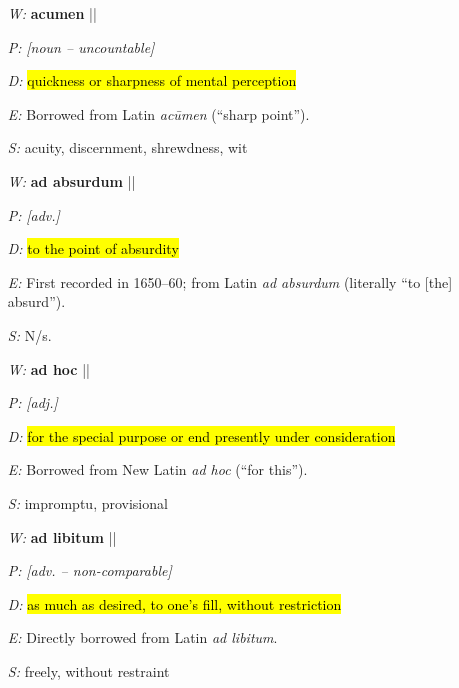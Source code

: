 \documentclass[11pt, table, dvipsnames, svgnames, x11names, xcdraw, titlepage]{article}
\begin{document}
\null

\begin{itemize}[itemsep=0pt, topsep=0pt]
\item[\textit{W:}] \textbf{acumen} \quad || \quad {}
\item[\textit{P:}] \textit{[noun – uncountable]}
\item[\textit{D:}] \hl{quickness or sharpness of mental perception}
\item[\textit{E:}] Borrowed from Latin \textit{ac\={u}men} (``sharp point'').
\item[\textit{S:}] acuity, discernment, shrewdness, wit
\end{itemize}

\null

\begin{itemize}[itemsep=0pt, topsep=0pt]
\item[\textit{W:}] \textbf{ad absurdum} \quad || \quad {}
\item[\textit{P:}] \textit{[adv.]}
\item[\textit{D:}] \hl{to the point of absurdity}
\item[\textit{E:}] First recorded in 1650–60; from Latin \textit{ad absurdum} (literally ``to [the] absurd'').
\item[\textit{S:}] N/s.
\end{itemize}

\null

\begin{itemize}[itemsep=0pt, topsep=0pt]
\item[\textit{W:}] \textbf{ad hoc} \quad || \quad {}
\item[\textit{P:}] \textit{[adj.]}
\item[\textit{D:}] \hl{for the special purpose or end presently under consideration}
\item[\textit{E:}] Borrowed from New Latin \textit{ad hoc} (``for this'').
\item[\textit{S:}] impromptu, provisional
\end{itemize}

\null

\begin{itemize}[itemsep=0pt, topsep=0pt]
\item[\textit{W:}] \textbf{ad libitum} \quad || \quad {}
\item[\textit{P:}] \textit{[adv. – non-comparable]}
\item[\textit{D:}] \hl{as much as desired, to one's fill, without restriction}
\item[\textit{E:}] Directly borrowed from Latin \textit{ad libitum}.
\item[\textit{S:}] freely, without restraint
\end{itemize}
\end{document}
